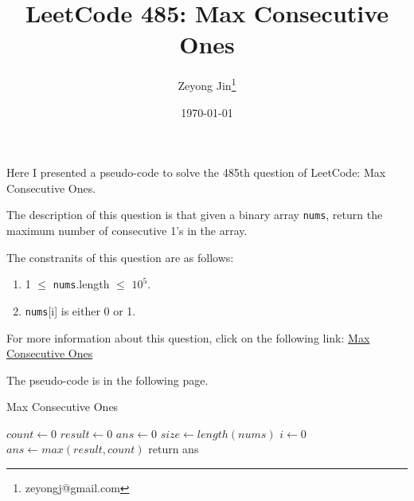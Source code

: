 \documentclass{article}
\title{LeetCode 485: Max Consecutive Ones}
\author{Zeyong Jin\thanks{zeyongj@gmail.com}}
\affil{School of Computing Sciences, Simon Fraser University}
\date{\today}
\begin{document}
\maketitle

Here I presented a pseudo-code to solve the 485th question of LeetCode: Max Consecutive Ones.

The description of this question is that given a binary array \texttt{nums}, return the maximum number of consecutive 1's in the array.

The constranits of this question are as follows:
\begin{enumerate}[label=(\alph*),leftmargin=2\parindent]
   \item 1 $\leq$ \texttt{nums}.length $\leq$ $10^{5}$.
   \item \texttt{nums}[i] is either 0 or 1.
\end{enumerate}


For more information about this question, click on the following link: 
    \href{https://leetcode.com/problems/max-consecutive-ones/}{Max Consecutive Ones}

The pseudo-code is in the following page.

{}

\begin{algorithm}[hbt!]
\caption{Max Consecutive Ones}\label{alg:two}
\LinesNumbered
{}
$count \gets 0$\;
$result \gets 0$\;
$ans \gets 0$\;
$size \gets length(nums)$\;
  {
  $i \gets 0$\;
$ans \gets max(result, count)$\;
return ans\;
  }

\end{algorithm}
\end{document}
